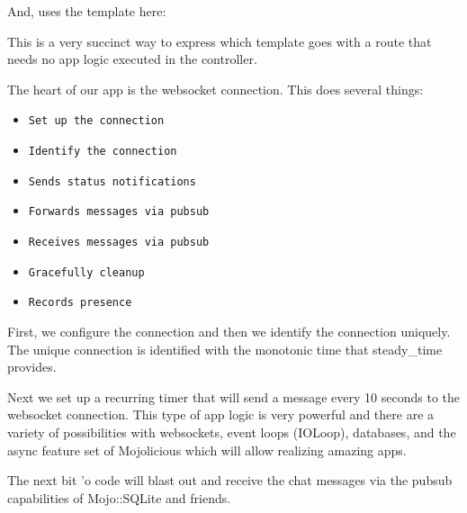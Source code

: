 \documentclass[14pt]{extreport}
\begin{document}


\clearpage

And, uses the template here:



This is a very succinct way to express which template goes with a route that
needs no app logic executed in the controller.

The heart of our app is the websocket connection.  This does several things:

\begin{itemize} \itemsep1pt \parskip0pt 
\item \verb|Set up the connection|
\item \verb|Identify the connection|
\item \verb|Sends status notifications|
\item \verb|Forwards messages via pubsub|
\item \verb|Receives messages via pubsub|
\item \verb|Gracefully cleanup|
\item \verb|Records presence|
\end{itemize}

First, we configure the connection and then we identify the connection
uniquely.  The unique connection is identified with the monotonic time that
steady\_time provides.



Next we set up a recurring timer that will send a message every 10 seconds to
the websocket connection.  This type of app logic is very powerful and there
are a variety of possibilities with websockets, event loops (IOLoop),
databases, and the async feature set of Mojolicious which will allow realizing
amazing apps.



The next bit 'o code will blast out and receive the chat messages via the
pubsub capabilities of Mojo::SQLite and friends.


\end{document}
